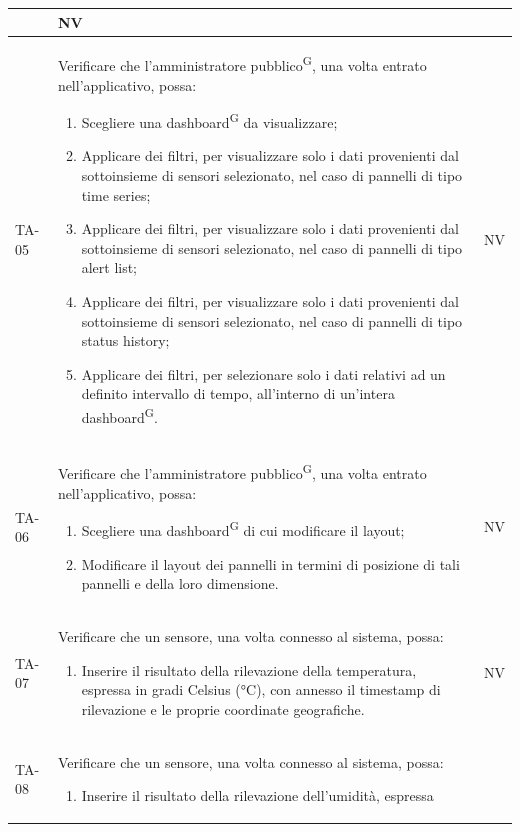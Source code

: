 \documentclass[8pt]{article}
\newcommand{\glossterm}[1]{#1\textsuperscript{G}} %
\begin{document}
\begin{longtable}{|>{\centering}p{2cm}|>{\RaggedRight}m{12cm}|>{\centering\arraybackslash}p{2cm}|}
\begin{enumerate}
    \end{enumerate}
    & NV \\
    \hline
    TA-05 & Verificare che l’\glossterm{amministratore pubblico}, una volta entrato nell’applicativo, possa:
    \begin{enumerate}
        \item Scegliere una \glossterm{dashboard} da visualizzare;
        \item Applicare dei filtri, per visualizzare solo i dati provenienti dal sottoinsieme di
            sensori selezionato, nel caso di pannelli di tipo time series; 
        \item Applicare dei filtri, per visualizzare solo i dati provenienti dal sottoinsieme di
            sensori selezionato, nel caso di pannelli di tipo alert list;
        \item Applicare dei filtri, per visualizzare solo i dati provenienti dal sottoinsieme di
            sensori selezionato, nel caso di pannelli di tipo status history;  
        \item Applicare dei filtri, per selezionare solo i dati relativi ad un definito intervallo
            di tempo, all’interno di un’intera \glossterm{dashboard}.
    \end{enumerate}
    & NV \\
    \hline
    TA-06 & Verificare che l’\glossterm{amministratore pubblico}, una volta entrato
    nell’applicativo, possa:
    \begin{enumerate}
        \item Scegliere una \glossterm{dashboard} di cui modificare il layout;
        \item Modificare il layout dei pannelli in termini di posizione di tali pannelli e della loro dimensione.
    \end{enumerate}
    & NV \\
    \hline
    TA-07 &
    Verificare che un sensore, una volta connesso al sistema, possa:
    \begin{enumerate}
        \item Inserire il risultato della rilevazione della temperatura, espressa in gradi Celsius
            (°C), con annesso il timestamp di rilevazione e le proprie coordinate geografiche.        
    \end{enumerate}
    & NV \\
    \hline
    TA-08 &
    Verificare che un sensore, una volta connesso al sistema, possa:
    \begin{enumerate}
    \item Inserire il risultato della rilevazione dell’umidità, espressa

\end{enumerate}
\end{longtable}
\end{document}
